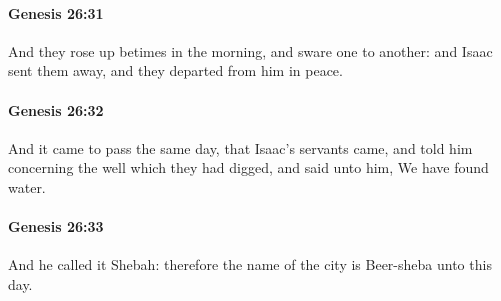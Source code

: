 		\paragraph{Genesis 26:31} %
			\label{GENESIS-26-31}

			And they rose up betimes in the morning, and sware one to another: and Isaac sent them away, and they departed from him in peace.


		\paragraph{Genesis 26:32} %
			\label{GENESIS-26-32}

			And it came to pass the same day, that Isaac's servants came, and told him concerning the well which they had digged, and said unto him, We have found water.


		\paragraph{Genesis 26:33} %
			\label{GENESIS-26-33}

			And he called it Shebah: therefore the name of the city is Beer-sheba unto this day.


